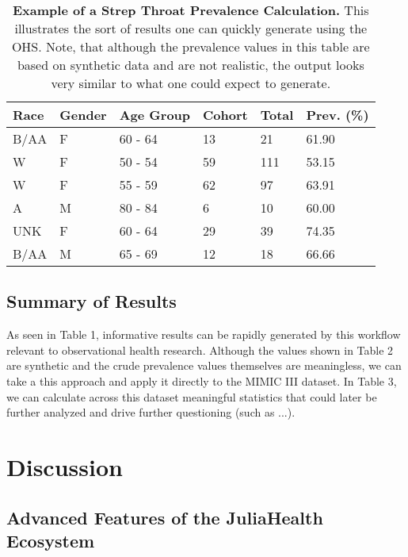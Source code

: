 \documentclass{juliacon}
\begin{document}
\begin{table}[!ht]
    \centering
    \begin{tabular}{|l|l|l|l|l|l|}
    \hline
        Race & Gender & Age Group & Cohort & Total & Prev. (\%) \\ \hline
        B/AA & F & 60 - 64 & 13 & 21 & 61.90 \\ \hline
        W & F & 50 - 54 & 59 & 111 & 53.15 \\ \hline
        W & F & 55 - 59 & 62 & 97 & 63.91 \\ \hline
        A & M & 80 - 84 & 6 & 10 & 60.00 \\ \hline
        UNK & F & 60 - 64 & 29 & 39 & 74.35 \\ \hline
        B/AA & M & 65 - 69 & 12 & 18 & 66.66 \\ \hline
    \end{tabular}
    \caption{\textbf{Example of a Strep Throat Prevalence Calculation.} This illustrates the sort of results one can quickly generate using the OHS. Note, that although the prevalence values in this table are based on synthetic data and are not realistic, the output looks very similar to what one could expect to generate.}
    \label{table:eunomia_prevalence}
\end{table}

\subsection{Summary of Results}

As seen in Table 1, informative results can be rapidly generated by this workflow relevant to observational health research.
Although the values shown in Table 2 are synthetic and the crude prevalence values themselves are meaningless, we can take a this approach and apply it directly to the MIMIC III dataset.
In Table 3, we can calculate across this dataset meaningful statistics that could later be further analyzed and drive further questioning (such as ...).

\section{Discussion}

\subsection{Advanced Features of the JuliaHealth Ecosystem}
\end{document}
